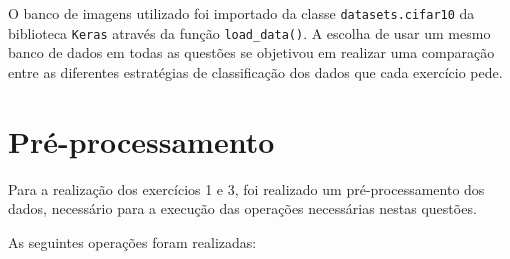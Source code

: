 \documentclass[]{abntex2}
\begin{document}
O banco de imagens utilizado foi importado da classe \texttt{datasets.cifar10} da biblioteca \texttt{Keras} através da função \texttt{load\_data()}. A escolha de usar um mesmo banco de dados em todas as questões se objetivou em realizar uma comparação entre as diferentes estratégias de classificação dos dados que cada exercício pede.



\section*{\textbf{Pré-processamento}}

Para a realização dos exercícios 1 e 3, foi realizado um pré-processamento dos dados, necessário para a execução das operações necessárias nestas questões.

As seguintes operações foram realizadas:
\end{document}
